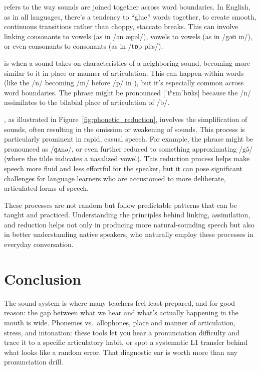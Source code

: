  refers to the way sounds are joined together across word boundaries. In English, as in all languages, there's a tendency to ``glue'' words together, to create smooth, continuous transitions rather than choppy, staccato breaks. This can involve linking consonants to vowels (as in  /ən æpəl/), vowels to vowels (as in  /gəʊ ɪn/), or even consonants to consonants (as in  /tɒp piːs/).

 is when a sound takes on characteristics of a neighboring sound, becoming more similar to it in place or manner of articulation. This can happen within words (like the /n/ becoming /m/ before /p/ in ), but it's especially common across word boundaries. The phrase  might be pronounced [ˈtʰɛmˈbʊks] because the /n/ assimilates to the bilabial place of articulation of /b/.

, as illustrated in Figure~\ref{fig:phonetic_reduction}, involves the simplification of sounds, often resulting in the omission or weakening of sounds. This process is particularly prominent in rapid, casual speech. For example, the phrase  might be pronounced as  /ɡʌnə/, or even further reduced to something approximating /g\~ə/ (where the tilde indicates a nasalized vowel). This reduction process helps make speech more fluid and less effortful for the speaker, but it can pose significant challenges for language learners who are accustomed to more deliberate, articulated forms of speech.

These processes are not random but follow predictable patterns that can be taught and practiced. Understanding the principles behind linking, assimilation, and reduction helps not only in producing more natural-sounding speech but also in better understanding native speakers, who naturally employ these processes in everyday conversation.


\section{Conclusion}

The sound system is where many teachers feel least prepared, and for good reason: the gap between what we hear and what's actually happening in the mouth is wide. Phonemes vs.\ allophones, place and manner of articulation, stress, and intonation: these tools let you hear a pronunciation difficulty and trace it to a specific articulatory habit, or spot a systematic L1 transfer behind what looks like a random error. That diagnostic ear is worth more than any pronunciation drill.

